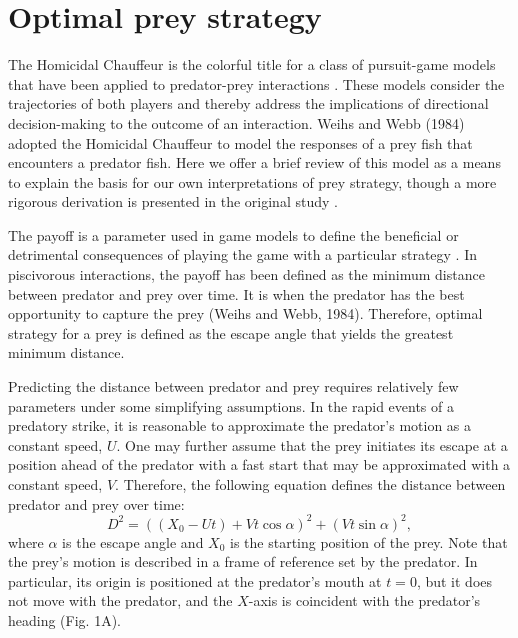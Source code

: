 \documentclass[12pt]{article}
\begin{document}
\section{Optimal prey strategy}

The Homicidal Chauffeur is the colorful title for a class of pursuit-game models that have been applied to predator-prey interactions \citep{Isaacs:1965va}. These models consider the trajectories of both players and thereby address the implications of directional decision-making to the outcome of an interaction. Weihs and Webb (1984) adopted the Homicidal Chauffeur to model the responses of a prey fish that encounters a predator fish. Here we offer a brief review of this model as a means to explain the basis for our own interpretations of prey strategy, though a more rigorous derivation is presented in the original study \citep{Weihs:1984tb}.

The payoff is a parameter used in game models to define the beneficial or detrimental consequences of playing the game with a particular strategy \citep{Webb:2007hg}. In piscivorous interactions, the payoff has been defined as the minimum distance between predator and prey over time. It is when the predator has the best opportunity to capture the prey (Weihs and Webb, 1984). Therefore, optimal strategy for a prey is defined as the escape angle that yields the greatest minimum distance.

Predicting the distance between predator and prey requires relatively few parameters under some simplifying assumptions. In the rapid events of a predatory strike, it is reasonable to approximate the predator's motion as a constant speed, $U$. One may further assume that the prey initiates its escape at a position ahead of the predator with a fast start that may be approximated with a constant speed, $V$. Therefore, the following equation defines the distance between predator and prey over time:
%
\begin{equation}
D^2 = ((X_0 - Ut) + Vt\cos\alpha)^2 + (Vt\sin\alpha)^2,
\label{dist}
\end{equation}
%
where $\alpha$ is the escape angle and $X_0$ is the starting position of the prey. Note that the prey's motion is described in a frame of reference set by the predator. In particular, its origin is positioned at the predator's mouth at $t= 0$, but it does not move with the predator, and the $X$-axis is coincident with the predator's heading (Fig. 1A). 
\end{document}
